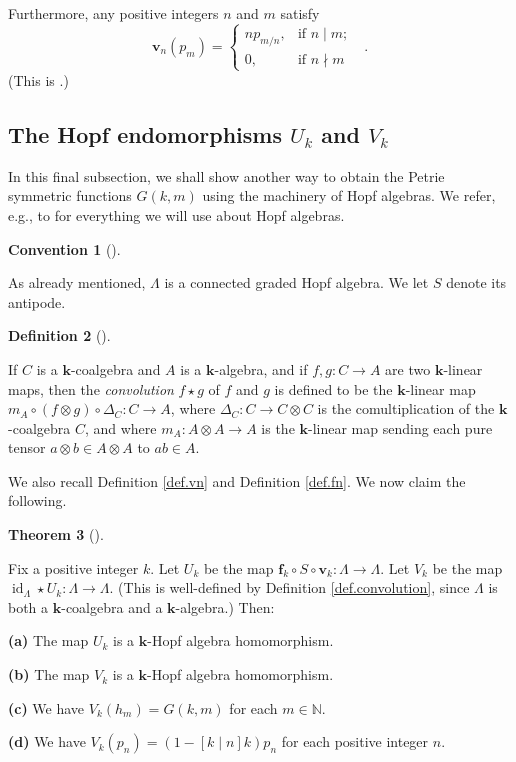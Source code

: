 \documentclass[numbers=enddot,12pt,final,onecolumn,notitlepage]{scrartcl}%
\theoremstyle{definition}
\newtheorem{theo}{Theorem}[section]
\newenvironment{theorem}[1][]
{\begin{theo}[#1]\begin{leftbar}}
{\end{leftbar}\end{theo}}
\newtheorem{defi}[theo]{Definition}
\newenvironment{definition}[1][]
{\begin{defi}[#1]\begin{leftbar}}
{\end{leftbar}\end{defi}}
\newtheorem{conv}[theo]{Convention}
\newenvironment{convention}[1][]
{\begin{conv}[#1]\begin{leftbar}}
{\end{leftbar}\end{conv}}
\begin{document}
Furthermore, any positive integers $n$ and $m$ satisfy%
\begin{equation}
\mathbf{v}_{n}\left(  p_{m}\right)  =%
\begin{cases}
np_{m/n}, & \text{if }n\mid m;\\
0, & \text{if }n\nmid m
\end{cases}
\ \ \ . \label{eq.vnpm}%
\end{equation}
(This is \cite[Exercise 2.9.10(a)]{GriRei}.)

\subsection{The Hopf endomorphisms $U_{k}$ and $V_{k}$}

In this final subsection, we shall show another way to obtain the Petrie
symmetric functions $G\left(  k,m\right)  $ using the machinery of Hopf
algebras. We refer, e.g., to \cite[Chapters 1 and 2]{GriRei} for everything we
will use about Hopf algebras.

\begin{convention}
As already mentioned, $\Lambda$ is a connected graded Hopf algebra. We let $S$
denote its antipode.
\end{convention}

\begin{definition}
\label{def.convolution}If $C$ is a $\mathbf{k}$-coalgebra and $A$ is a
$\mathbf{k}$-algebra, and if $f,g:C\rightarrow A$ are two $\mathbf{k}$-linear
maps, then the \emph{convolution} $f\star g$ of $f$ and $g$ is defined to be
the $\mathbf{k}$-linear map $m_{A}\circ\left(  f\otimes g\right)  \circ
\Delta_{C}:C\rightarrow A$, where $\Delta_{C}:C\rightarrow C\otimes C$ is the
comultiplication of the $\mathbf{k}$-coalgebra $C$, and where $m_{A}:A\otimes
A\rightarrow A$ is the $\mathbf{k}$-linear map sending each pure tensor
$a\otimes b\in A\otimes A$ to $ab\in A$.
\end{definition}

We also recall Definition \ref{def.vn} and Definition \ref{def.fn}. We now
claim the following.

\begin{theorem}
\label{thm.Uk.main}Fix a positive integer $k$. Let $U_{k}$ be the map
$\mathbf{f}_{k}\circ S\circ\mathbf{v}_{k}:\Lambda\rightarrow\Lambda$. Let
$V_{k}$ be the map $\operatorname*{id}\nolimits_{\Lambda}\star U_{k}%
:\Lambda\rightarrow\Lambda$. (This is well-defined by Definition
\ref{def.convolution}, since $\Lambda$ is both a $\mathbf{k}$-coalgebra and a
$\mathbf{k}$-algebra.) Then:

\textbf{(a)} The map $U_{k}$ is a $\mathbf{k}$-Hopf algebra homomorphism.

\textbf{(b)} The map $V_{k}$ is a $\mathbf{k}$-Hopf algebra homomorphism.

\textbf{(c)} We have $V_{k}\left(  h_{m}\right)  =G\left(  k,m\right)  $ for
each $m\in\mathbb{N}$.

\textbf{(d)} We have $V_{k}\left(  p_{n}\right)  =\left(  1-\left[  k\mid
n\right]  k\right)  p_{n}$ for each positive integer $n$.
\end{theorem}
\end{document}
